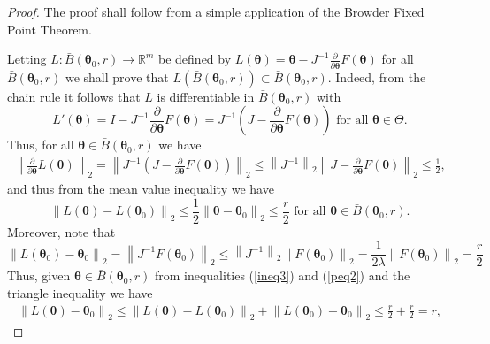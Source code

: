 \documentclass[12pt]{article} %
\newcommand{\bs}{\boldsymbol}
\theoremstyle{definition}
\begin{document}
 \begin{proof} The proof shall follow from a simple application of the Browder Fixed Point Theorem.

Letting $L:\bar{B}(\bs{\theta}_0,r)\to \mathbb{R}^m$ be defined by
$L(\bs{\theta})=\bs{\theta}-J^{-1} \frac{\partial}{\partial \bs{\theta}} F(\bs{\theta})$ for all $\bar{B}(\bs{\theta}_0,r)$
we shall prove that $L(\bar{B}(\bs{\theta}_0,r))\subset \bar{B}(\bs{\theta}_0,r)$. Indeed, from the chain rule it follows that $L$ is differentiable in $\bar{B}(\bs{\theta}_0,r)$ with
\begin{equation*}
L'(\bs{\theta})=I-J^{-1} \frac{\partial}{\partial \bs{\theta}}F(\bs{\theta})=J^{-1}\left(J-\frac{\partial}{\partial \bs{\theta}} F(\bs{\theta})\right)\mbox{ for all }\bs{\theta}\in \Theta.
\end{equation*}
Thus, for all $\bs{\theta}\in \bar{B}(\bs{\theta}_0,r)$ we have
\begin{equation*}
\begin{aligned}
\label{peq1}
\left\|\frac{\partial}{\partial \bs{\theta}} L(\bs{\theta})\right\|_2=\left\|J^{-1}\left(J-\frac{\partial}{\partial \bs{\theta}} F(\bs{\theta})\right)\right\|_2\leq \left\|J^{-1}\right\|_2\left\|J-\frac{\partial}{\partial \bs{\theta}} F(\bs{\theta})\right\|_2\leq \frac{1}{2},
\end{aligned}
\end{equation*}
and thus from the mean value inequality we have
\begin{equation}\label{ineq3}
\left\|L(\bs{\theta})-L(\bs{\theta}_0)\right\|_2\leq \frac{1}{2} \left\|\bs{\theta}-\bs{\theta}_0\right\|_2\leq \frac{r}{2}\mbox{ for all }\bs{\theta}\in \bar{B}(\bs{\theta}_0,r).
\end{equation}
Moreover, note that
\begin{equation}\label{peq2}\left\|L(\bs{\theta}_0)-\bs{\theta}_0\right\|_2=\left\|J^{-1}F(\bs{\theta}_0)\right\|_2\leq \left\|J^{-1}\right\|_2\left\|F(\bs{\theta}_0)\right\|_2 =\frac{1}{2\lambda}\left\|F(\bs{\theta}_0)\right\|_2=\frac{r}{2}
\end{equation}
Thus, given $\bs{\theta}\in \bar{B}(\bs{\theta}_0,r)$ from inequalities (\ref{ineq3}) and  (\ref{peq2}) and the triangle inequality we have
\begin{equation*}
\begin{aligned}
\left\|L(\bs{\theta})-\bs{\theta}_0\right\|_2\leq \left\|L(\bs{\theta})-L(\bs{\theta}_0)\right\|_2+\left\|L(\bs{\theta}_0)-\bs{\theta}_0\right\|_2\leq \frac{r}{2}+\frac{r}{2}= r,
\end{aligned}

\end{equation*}
\end{proof}
\end{document}
